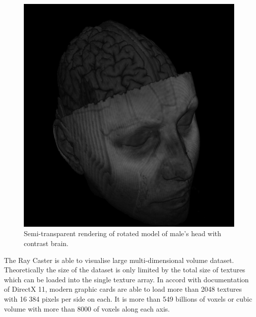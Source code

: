 \documentclass[twoside, english, 11pt]{report}
\begin{document}
\begin{figure}[H]
\centerline{\includegraphics[scale = 0.6]{img/brain}}
\caption{Semi-transparent rendering of rotated model of male's head with contrast brain.\label{fig:brain}}
\end{figure}

The Ray Caster is able to visualise large multi-dimensional volume dataset. Theoretically the size of the dataset is only limited by the total size of textures which can be loaded into the single texture array. In accord with documentation of DirectX 11, modern graphic cards are able to load more than 2048 textures with 16 384 pixels per side on each. It is more than 549 billions of voxels or cubic volume with more than 8000 of voxels along each axis.\\
\end{document}
